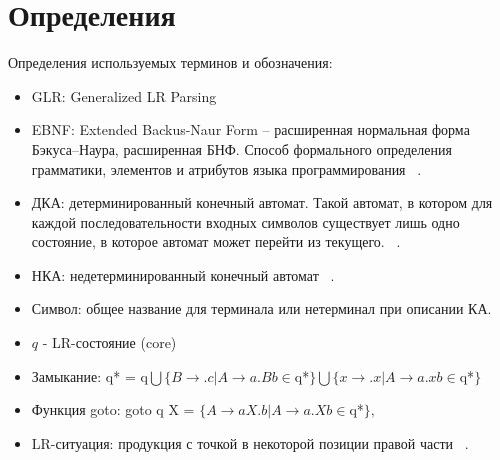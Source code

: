 \section{Определения}

Определения используемых терминов и обозначения:
\begin{itemize}
\item GLR: Generalized LR Parsing ~\cite{CurrentParsTechn}
\item EBNF: Extended Backus-Naur Form – расширенная нормальная форма Бэкуса–Наура, расширенная БНФ. Способ формального определения грамматики, элементов и атрибутов языка программирования ~\cite{ISOEBNF}.
\item ДКА: детерминированный конечный автомат. Такой автомат, в котором для каждой последовательности входных символов существует лишь одно состояние, в которое автомат может перейти из текущего. ~\cite{DrgBook}.
\item НКА: недетерминированный конечный автомат  ~\cite{DrgBook}.
\item Символ: общее название для терминала или нетерминал  при описании КА.   
\item $q$ - LR-состояние (core) ~\cite{DrgBook}
\item Замыкание: q* = q$ \bigcup \{B\rightarrow.c | A \rightarrow a.Bb \in $q*$\} \bigcup \{x\stackrel{}{\rightarrow}.x | A\stackrel{}{\rightarrow} a.xb \in $q*$\}$ ~\cite{DrgBook}
\item Функция goto: goto  q X = $\{A\stackrel{}{\rightarrow}aX.b | A\rightarrow a.Xb \in $q*$\}, $
\item LR-ситуация: продукция с точкой в некоторой позиции правой части ~\cite{DrgBook}.
\end{itemize} 